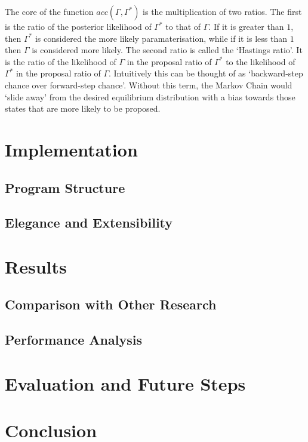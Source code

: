 \documentclass[10pt,journal,compsoc]{IEEEtran}
\begin{document}
The core of the function $acc(\Gamma, \Gamma^*)$ is the multiplication of two ratios. The first is the ratio of the posterior likelihood of $\Gamma^*$ to that of $\Gamma$. If it is greater than $1$, then $\Gamma^*$ is considered the more likely paramaterisation, while if it is less than $1$ then $\Gamma$ is considered more likely. The second ratio is called the `Hastings ratio'. It is the ratio of the likelihood of $\Gamma$ in the proposal ratio of $\Gamma^*$ to the likelihood of $\Gamma^*$ in the proposal ratio of $\Gamma$. Intuitively this can be thought of as `backward-step chance over forward-step chance'. Without this term, the Markov Chain would `slide away' from the desired equilibrium distribution with a bias towards those states that are more likely to be proposed.

\section{Implementation}

\subsection{Program Structure}

\subsection{Elegance and Extensibility}

\section{Results}

\subsection{Comparison with Other Research}

\subsection{Performance Analysis}

\section{Evaluation and Future Steps}

\section{Conclusion}

\newpage



\end{document}
